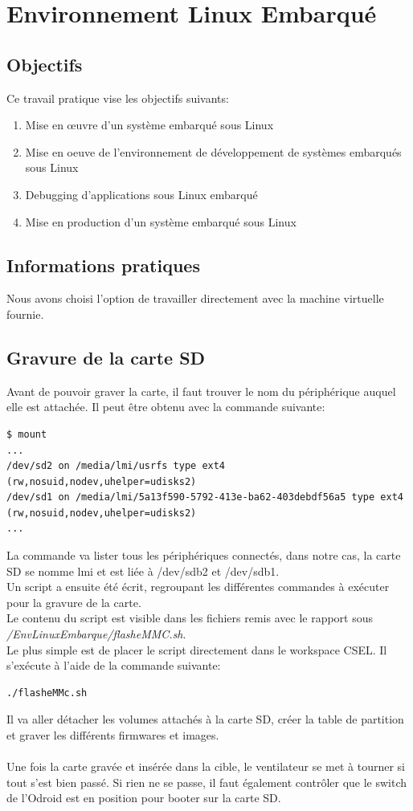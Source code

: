 \section{Environnement Linux Embarqué}
\subsection{Objectifs}
\noindent
Ce travail pratique vise les objectifs suivants:
\begin{enumerate}
	\item Mise en œuvre d'un système embarqué sous Linux
	\item Mise en oeuve de l'environnement de développement de systèmes embarqués sous Linux
	\item Debugging d'applications sous Linux embarqué
	\item Mise en production d'un système embarqué sous Linux
\end{enumerate}
\subsection{Informations pratiques}
Nous avons choisi l'option de travailler directement avec la machine virtuelle fournie.
\subsection{Gravure de la carte SD}
Avant de pouvoir graver la carte, il faut trouver le nom du périphérique auquel elle est attachée. Il peut être obtenu avec la commande suivante:
\begin{lstlisting}
$ mount
...
/dev/sd2 on /media/lmi/usrfs type ext4 (rw,nosuid,nodev,uhelper=udisks2)
/dev/sd1 on /media/lmi/5a13f590-5792-413e-ba62-403debdf56a5 type ext4 (rw,nosuid,nodev,uhelper=udisks2)
...
\end{lstlisting}
La commande va lister tous les périphériques connectés, dans notre cas, la carte SD se nomme lmi et est liée à /dev/sdb2 et /dev/sdb1.\\
Un script a ensuite été écrit, regroupant les différentes commandes à exécuter pour la gravure de la carte.\\
Le contenu du script est visible dans les fichiers remis avec le rapport sous \textit{/EnvLinuxEmbarque/flasheMMC.sh}.\\
Le plus simple est de placer le script directement dans le workspace CSEL. Il s'exécute à l'aide de la commande suivante:
\begin{lstlisting}
./flasheMMc.sh
\end{lstlisting}
Il va aller détacher les volumes attachés à la carte SD, créer la table de partition et graver les différents firmwares et images.\\
\\
Une fois la carte gravée et insérée dans la cible, le ventilateur se met à tourner si tout s’est bien passé. Si rien ne se passe, il faut également contrôler que le switch de l’Odroid est en position pour booter sur la carte SD.
